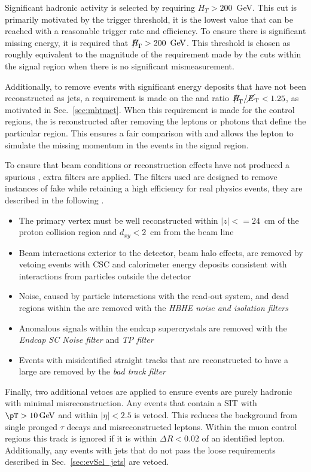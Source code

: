 Significant hadronic activity is selected by requiring $H_T>200$~GeV.
This cut is primarily motivated by the trigger threshold, it is the
lowest \HT value that can be reached with a reasonable trigger rate
and efficiency. To ensure there is significant missing energy, it is
required that $\MHT>200~\gev$.  This threshold is chosen as roughly
equivalent to the magnitude of the \MET requirement made by the
\alphat cuts within the signal region when there is no significant
mismeasurement. 

Additionally, to remove events with significant energy deposits that
have not been reconstructed as jets, a requirement is made on the \MHT
and \MET ratio $\mhtmet<1.25$, as motivated in Sec.~\ref{sec:mhtmet}.
When this requirement is made for the control regions, the \MET is
reconstructed after removing the leptons or photons that define the
particular region. This ensures a fair comparison with \MHT and allows
the lepton to simulate the missing momentum in the events in the
signal region.

To ensure that beam conditions or reconstruction effects have
not produced a spurious \MET, extra filters are applied. The filters
used are designed to remove instances of fake \MET while retaining
a high efficiency for real physics events, they are described in the
following \cite{1748-0221-10-02-P02006}.
\begin{itemize}
\item{The primary vertex must be well reconstructed within
$|z|<=24$~cm of the proton collision region and $d_{xy}<2$~cm from the
beam line}
\item{Beam interactions exterior to the detector, beam halo effects,
are removed by vetoing events with \ac{CSC} and calorimeter energy
deposits consistent with interactions from particles outside the
detector}
\item{Noise, caused by particle interactions with the read-out system,
and dead regions within the \HCAL are removed with the \emph{HBHE
noise and isolation filters}}
\item{Anomalous signals within the \ECAL endcap supercrystals are removed
with the \emph{\ECAL Endcap SC Noise filter} and \emph{\ECAL \ac{TP}
filter}}
\item{Events with misidentified straight tracks that are reconstructed
to have a large \pT are removed by the \emph{bad track filter}}
\end{itemize}

Finally, two additional vetoes are applied to ensure events are purely
hadronic with minimal misreconstruction. Any events that contain a
\ac{SIT} with $\pT > 10\gev$ and within $|\eta| < 2.5$ is vetoed. This
reduces the background from single pronged $\tau$ decays and
misreconstructed leptons. Within the muon control regions this track
is ignored if it is within $\Delta R <0.02$ of an identified lepton.
Additionally, any events with jets that do not pass the loose
requirements described in Sec.~\ref{sec:evSel_jets} are vetoed.

